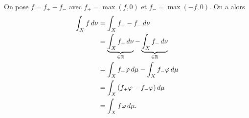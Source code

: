 {\begin{td-sol}[]
\begin{enumerate}
\begin{enumerate}
                On pose \(f=f_+-f_-\) avec \(f_+=\max\left(f,0\right)\) et \(f_-=\max\left(-f,0\right)\).
                On a alors
                \begin{equation*}
                    \begin{aligned}
                        \int_X f\der\nu
                        &= \int_X f_+ - f_-\der\nu \\
                        &= \underbrace{\int_X f_+\der\nu}_{\in\R} - \underbrace{\int_X f_-\der\nu}_{\in\R} \\
                        &= \int_X f_+\varphi\der\mu - \int_X f_-\varphi\der\mu \\
                        &= \int_X \left(f_+\varphi - f_-\varphi\right)\der\mu \\
                        &= \int_X f\varphi\der\mu.
                    \end{aligned}
                \end{equation*}
            \end{enumerate}
        \end{enumerate}
    \end{td-sol}
}{}

